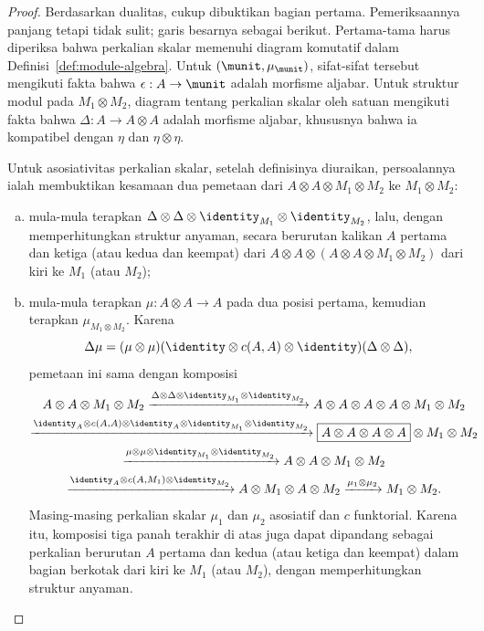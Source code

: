 \begin{proof}
	Berdasarkan dualitas, cukup dibuktikan bagian pertama. Pemeriksaannya panjang
	tetapi tidak sulit; garis besarnya sebagai berikut. Pertama-tama harus
	diperiksa bahwa perkalian skalar memenuhi diagram komutatif dalam
	Definisi~\ref{def:module-algebra}. Untuk $(\munit,\mu_{\munit})$,
	sifat-sifat tersebut mengikuti fakta bahwa
	$\epsilon:A\to\munit$ adalah morfisme aljabar. Untuk struktur modul pada
	$M_1\otimes M_2$, diagram tentang perkalian skalar oleh satuan mengikuti
	fakta bahwa $\Delta:A\to A\otimes A$ adalah morfisme aljabar,
	khususnya bahwa ia kompatibel dengan $\eta$ dan $\eta\otimes\eta$.

	Untuk asosiativitas perkalian skalar, setelah definisinya diuraikan,
	persoalannya ialah membuktikan kesamaan dua pemetaan dari
	$A\otimes A\otimes M_1\otimes M_2$ ke $M_1\otimes M_2$:
	\begin{enumerate}[(a)]
		\item mula-mula terapkan
		$\Delta\otimes\Delta\otimes\identity_{M_1}\otimes\identity_{M_2}$,
		lalu, dengan memperhitungkan struktur anyaman, secara berurutan kalikan $A$ pertama dan
		ketiga (atau kedua dan keempat) dari
		$A\otimes A\otimes(A\otimes A\otimes M_1\otimes M_2)$ dari kiri ke
		$M_1$ (atau $M_2$);
		\item mula-mula terapkan $\mu:A\otimes A\to A$ pada dua posisi pertama,
		kemudian terapkan $\mu_{M_1\otimes M_2}$. Karena
		\[ \Delta\mu = (\mu \otimes \mu) (\identity \otimes c(A, A) \otimes \identity)(\Delta \otimes \Delta), \]
		pemetaan ini sama dengan komposisi
		\begin{multline*}
			A \otimes A \otimes M_1 \otimes M_2 \xrightarrow{\Delta \otimes \Delta \otimes \identity_{M_1} \otimes \identity_{M_2}} A \otimes A \otimes A \otimes A \otimes M_1 \otimes M_2 \\
			\xrightarrow{\identity_A \otimes c(A, A) \otimes \identity_A \otimes \identity_{M_1} \otimes \identity_{M_2}} \boxed{A \otimes A \otimes A \otimes A} \otimes M_1 \otimes M_2 \\
			\xrightarrow{\mu \otimes \mu \otimes \identity_{M_1} \otimes \identity_{M_2}} A \otimes A \otimes M_1 \otimes M_2 \\
			\xrightarrow{\identity_A \otimes c(A, M_1) \otimes \identity_{M_2}} A \otimes M_1 \otimes A \otimes M_2 \xrightarrow{\mu_1 \otimes \mu_2} M_1 \otimes M_2.
		\end{multline*}
		Masing-masing perkalian skalar $\mu_1$ dan $\mu_2$ asosiatif dan $c$
		funktorial. Karena itu, komposisi tiga panah terakhir di atas juga dapat
		dipandang sebagai perkalian berurutan $A$ pertama dan kedua (atau
		ketiga dan keempat) dalam bagian berkotak dari kiri ke $M_1$ (atau
		$M_2$), dengan memperhitungkan struktur anyaman.
	\end{enumerate}


\end{proof}
